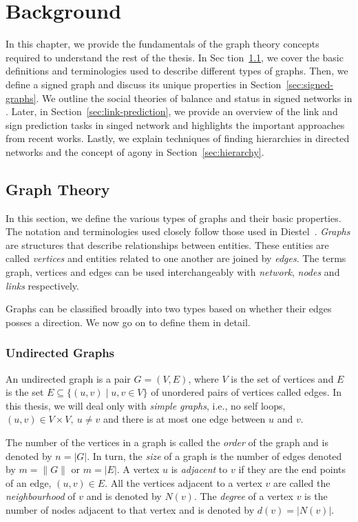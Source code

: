 
\chapter{Background}
\label{chp:background}

In this chapter, we provide the fundamentals of the graph theory concepts required to understand the rest of the thesis.
In Sec tion~\ref{sec:prelim}, we cover the basic definitions and terminologies used to describe different types of graphs.
Then, we define a signed graph and discuss its unique properties in Section~\ref{sec:signed-graphs}.
We outline the social theories of balance and status in signed networks in .
Later, in Section~\ref{sec:link-prediction}, we provide an overview of the link and sign prediction tasks in singed network and highlights the important approaches from recent works.
Lastly, we explain techniques of finding hierarchies in directed networks and the concept of agony in Section~\ref{sec:hierarchy}.

\section{Graph Theory}
\label{sec:prelim}
In this section, we define the various types of graphs and their basic properties.
The notation and terminologies used closely follow those used in Diestel~\cite{diestel1997graph}.
\textit{Graphs} are structures that describe relationships between entities.
These entities are called \textit{vertices} and entities related to one another are joined by \textit{edges}.
The terms graph, vertices and edges can be used interchangeably with \textit{network}, \textit{nodes} and \textit{links} respectively.

Graphs can be classified broadly into two types based on whether their edges posses a direction.
We now go on to define them in detail.
\subsection{Undirected Graphs}
An undirected graph is a pair $G=(V,E)$, where $V$ is the set of vertices and $E$ is the set $E \subseteq \{ (u,v) \mid u,v \in V\}$ of unordered pairs of vertices called edges.
In this thesis, we will deal only with \textit{simple graphs}, i.e., no self loops, $(u,v)\in V \times V, ~ u\neq v$ and there is at most one edge between $u$ and $v$. 

The number of the vertices in a graph is called the \textit{order} of the graph and is denoted by $n= |G|$.
In turn, the \textit{size} of a graph is the number of edges denoted by $m = \|G\|$ or $m=|E|$.
A vertex $u$ is \textit{adjacent} to $v$ if they are the end points of an edge, $(u,v) \in E$.
All the vertices adjacent to a vertex $v$ are called the \textit{neighbourhood} of $v$ and is denoted by $N(v)$.
The \textit{degree} of a vertex $v$ is the number of nodes adjacent to that vertex and is denoted by $d(v) = |N(v)|$. 

